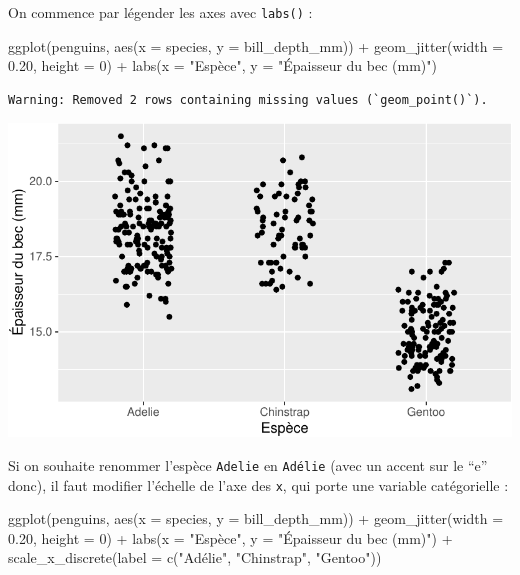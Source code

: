 \documentclass[
  a4paper,
  DIV=11,
  numbers=noendperiod,
  oneside]{scrreprt}
\newenvironment{Shaded}{}{}
\newcommand{\AttributeTok}[1]{\textcolor[rgb]{0.84,0.23,0.29}{#1}}
\newcommand{\DecValTok}[1]{\textcolor[rgb]{0.00,0.36,0.77}{#1}}
\newcommand{\FloatTok}[1]{\textcolor[rgb]{0.00,0.36,0.77}{#1}}
\newcommand{\FunctionTok}[1]{\textcolor[rgb]{0.44,0.26,0.76}{#1}}
\newcommand{\NormalTok}[1]{\textcolor[rgb]{0.14,0.16,0.18}{#1}}
\newcommand{\SpecialCharTok}[1]{\textcolor[rgb]{0.00,0.36,0.77}{#1}}
\newcommand{\StringTok}[1]{\textcolor[rgb]{0.01,0.18,0.38}{#1}}
\begin{document}
On commence par légender les axes avec \texttt{labs()} :

\begin{Shaded}
\begin{Highlighting}[]
\FunctionTok{ggplot}\NormalTok{(penguins, }\FunctionTok{aes}\NormalTok{(}\AttributeTok{x =}\NormalTok{ species, }\AttributeTok{y =}\NormalTok{ bill\_depth\_mm)) }\SpecialCharTok{+}
  \FunctionTok{geom\_jitter}\NormalTok{(}\AttributeTok{width =} \FloatTok{0.20}\NormalTok{, }\AttributeTok{height =} \DecValTok{0}\NormalTok{) }\SpecialCharTok{+}
  \FunctionTok{labs}\NormalTok{(}\AttributeTok{x =} \StringTok{"Espèce"}\NormalTok{, }\AttributeTok{y =} \StringTok{"Épaisseur du bec (mm)"}\NormalTok{)}
\end{Highlighting}
\end{Shaded}

\begin{verbatim}
Warning: Removed 2 rows containing missing values (`geom_point()`).
\end{verbatim}

\includegraphics{03-visualization_files/figure-pdf/unnamed-chunk-104-1.pdf}

Si on souhaite renommer l'espèce \texttt{Adelie} en \texttt{Adélie}
(avec un accent sur le ``e'' donc), il faut modifier l'échelle de l'axe
des \texttt{x}, qui porte une variable catégorielle :

\begin{Shaded}
\begin{Highlighting}[]
\FunctionTok{ggplot}\NormalTok{(penguins, }\FunctionTok{aes}\NormalTok{(}\AttributeTok{x =}\NormalTok{ species, }\AttributeTok{y =}\NormalTok{ bill\_depth\_mm)) }\SpecialCharTok{+}
  \FunctionTok{geom\_jitter}\NormalTok{(}\AttributeTok{width =} \FloatTok{0.20}\NormalTok{, }\AttributeTok{height =} \DecValTok{0}\NormalTok{) }\SpecialCharTok{+}
  \FunctionTok{labs}\NormalTok{(}\AttributeTok{x =} \StringTok{"Espèce"}\NormalTok{, }\AttributeTok{y =} \StringTok{"Épaisseur du bec (mm)"}\NormalTok{) }\SpecialCharTok{+}
  \FunctionTok{scale\_x\_discrete}\NormalTok{(}\AttributeTok{label =} \FunctionTok{c}\NormalTok{(}\StringTok{"Adélie"}\NormalTok{, }\StringTok{"Chinstrap"}\NormalTok{, }\StringTok{"Gentoo"}\NormalTok{))}
\end{Highlighting}
\end{Shaded}
\end{document}
